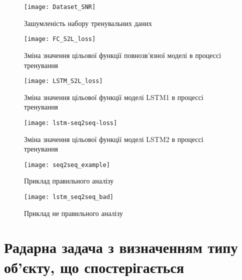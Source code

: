 \begin{figure}[htbp] \begin{center}
\texttt{[image: Dataset\_SNR]}
\caption{Зашумленість набору тренувальних даних} \label{fig:SNR}
\end{center} \end{figure}

\begin{figure}[htbp] \begin{center}
\texttt{[image: FC\_S2L\_loss]}
\caption{Зміна значення цільової функції повнозв'язної моделі  
в процессі тренування} \label{fig:fcnn_loss}
\end{center} \end{figure}

\begin{figure}[htbp] \begin{center}
\texttt{[image: LSTM\_S2L\_loss]}
\caption{Зміна значення цільової функції моделі LSTM1 
в процессі тренування} \label{fig:lstm_loss}
\end{center} \end{figure}

\begin{figure}[htbp] \begin{center}
\texttt{[image: lstm-seq2seq-loss]}
\caption{Зміна значення цільової функції моделі LSTM2 
в процессі тренування} \label{fig:lstm_seq2seq_loss}
\end{center} \end{figure}

\begin{figure}[htbp] \begin{center}
\texttt{[image: seq2seq\_example]}
\caption{Приклад правильного аналізу} \label{fig:seq2seq_example}
\end{center} \end{figure}

\begin{figure}[htbp] \begin{center}
\texttt{[image: lstm\_seq2seq\_bad]}
\caption{Приклад не правильного аналізу} \label{fig:lstm_seq2seq_bad}
\end{center} \end{figure}

\section{Радарна задача з визначенням типу об'єкту, що спостерігається}

